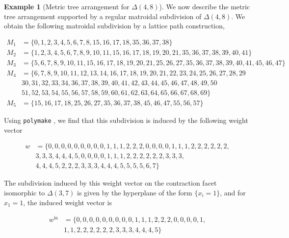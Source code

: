 \documentclass[12pt]{article}
\theoremstyle{plain}
\theoremstyle{definition}
\numberwithin{subcase}{case}
\newtheorem{example}[theorem]{Example}
\begin{document}
\begin{example}[Metric tree arrangement for $\Delta(4,8)$]\label{eg:Dr(4,8)}
We now describe the metric tree arrangement supported by a regular matroidal subdivision of $\Delta(4,8)$. We obtain the following matroidal subdivision by a lattice path construction,


\begin{equation*}
\begin{split}
 M_{1} & = \{0,1,2,3,4,5,6,7,8,15,16,17,18,35,36,37,38\} \\
 M_{2} & = \{1,2,3,4,5,6,7,8,9,10,11,15,16,17,18,19,20,21,35,36,37,38,39,40,41\} \\
  M_{3} & = \{5,6,7,8,9,10,11,15,16,17,18,19,20,21,25,26,27,35,36,37,38,39,40,41,45,46,47\} \\
  M_{4} &= \{6,7,8,9,10,11,12,13,14,16,17,18,19,20,21,22,23,24,25,26,27,28,29 \\
 & 30,31,32,33,34,36,37,38,39,40,41,42,43,44,45,46,47,48,49,50 \\
  & 51,52,53,54,55,56,57,58,59,60,61,62,63,64,65,66,67,68,69\} \\
   M_{5} & = \{15,16,17,18,25,26,27,35,36,37,38,45,46,47,55,56,57\} 
\end{split}
\end{equation*}

Using {\tt polymake} \cite{polymake:2000}, we find that this subdivision is induced by the following weight vector 

\begin{equation*}
\begin{split}
w & =\{0,0,0,0,0,0,0,0,0,1,1,1,2,2,2,0,0,0,0,1,1,1,2,2,2,2,2,2, \\
 & 3,3,3,4,4,4,5,0,0,0,0,1,1,1,2,2,2,2,2,2,3,3,3, \\
 & 4,4,4,5,2,2,2,3,3,3,4,4,4,5,5,5,5,6,7\} 
\end{split}
\end{equation*}



The subdivision induced by this weight vector on the contraction facet isomorphic to $\Delta(3,7)$ is given by the hyperplane of the form $\{x_{i} = 1\}$, and for $x_{1} = 1$, the induced weight vector is 

\begin{equation*}
\begin{split}
 w^{\text{in}} & = \{0,0,0,0,0,0,0,0,0,1,1,1,2,2,2,0,0,0,0,1,
  \\
  & 1,1,2,2,2,2,2,2,3,3,3,4,4,4,5\} 
\end{split}
\end{equation*}



\end{example}
\end{document}
